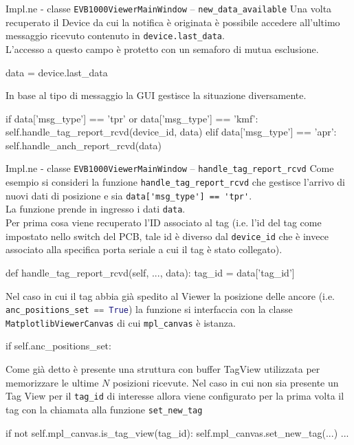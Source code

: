 \begin{frame}[fragile, shrink=30]{Impl.ne - classe \lstinline!EVB1000ViewerMainWindow! -- \lstinline!new_data_available!}
  Una volta recuperato il Device da cui la notifica è originata è possibile accedere all'ultimo
  messaggio ricevuto contenuto in \lstinline!device.last_data!.\\
  L'accesso a questo campo è protetto con un semaforo di mutua esclusione.
  \begin{Python}
        data = device.last_data
  \end{Python}

  In base al tipo di messaggio la GUI gestisce la situazione diversamente.
  \begin{Python}
        if data['msg_type'] == 'tpr' or data['msg_type'] == 'kmf':
            self.handle_tag_report_rcvd(device_id, data)
        elif data['msg_type'] == 'apr':
            self.handle_anch_report_rcvd(data)
  \end{Python}

\end{frame}

\begin{frame}[fragile, shrink=30]{Impl.ne - classe \lstinline!EVB1000ViewerMainWindow! -- \lstinline!handle_tag_report_rcvd!}
  Come esempio si consideri la funzione \lstinline!handle_tag_report_rcvd! che gestisce l'arrivo di nuovi dati di posizione
  e sia \lstinline!data['msg_type'] == 'tpr'!.\\
  La funzione prende in ingresso i dati \lstinline!data!.\\
  Per prima cosa viene recuperato l'ID associato al \alert{tag} (i.e. l'id del tag come impostato nello switch
  del PCB, tale id è diverso dal \lstinline!device_id! che è invece associato alla specifica porta seriale a cui
  il tag è stato collegato).
  \begin{Python}
    def handle_tag_report_rcvd(self, ..., data):
        tag_id = data['tag_id']
  \end{Python}

  Nel caso in cui il tag abbia già spedito al Viewer la posizione delle ancore (i.e.
  \lstinline[language=Python]!anc_positions_set == True!) la funzione si interfaccia
  con la classe \lstinline!MatplotlibViewerCanvas! di cui \lstinline!mpl_canvas! è istanza.
  \begin{Python}
        if self.anc_positions_set:
  \end{Python}

  Come già detto è presente una struttura con buffer TagView utilizzata per memorizzare le ultime
  $N$ posizioni ricevute.
  Nel caso in cui non sia presente un Tag View per il \lstinline!tag_id! di interesse
  allora viene configurato \alert{per la prima volta} il tag con la chiamata alla funzione
  \lstinline!set_new_tag!
  \begin{Python}
            if not self.mpl_canvas.is_tag_view(tag_id):
                self.mpl_canvas.set_new_tag(...)
            ...
  \end{Python}
\end{frame}

